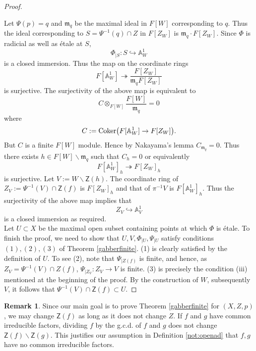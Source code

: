\documentclass[10pt]{amsart}
\theoremstyle{plain}
\theoremstyle{definition}
\newtheorem{remark}[thm]{Remark}
\newcommand{\inj}{\hookrightarrow}
\newcommand{\tensor}{\otimes}
\newcommand{\intersection}{\cap}
\newcommand{\A}{{\mathbb A}}
\let\syn\mathsf
\begin{document}
\begin{proof}
\begin{center}
\end{center}


Let $\Psi(p)=q$  and ${\mathfrak m}_q$ be the maximal ideal in $F[W]$ corresponding to $q$. Thus the ideal corresponding to $S=\Psi^{-1}(q)\intersection Z$ in $F[Z_W]$ is ${\mathfrak m}_q\cdot F[Z_W]$. Since $\Phi$ is radicial as well as \'{e}tale at $S$, $$\Phi_{|S}:S\inj \A^1_W$$ is a closed immersion. Thus the map on the coordinate rings 
$$F[\A^1_W] \twoheadrightarrow \frac{F[Z_W]}{{\mathfrak m}_q F[Z_W]}$$
is surjective. The surjectivity of the above map is equivalent to 
 $$ C\tensor_{F[W]} \frac{F[W]}{{\mathfrak m}_q}=0 $$
where $$C:={\rm Coker}\big(F[\A^1_W] \rightarrow F[Z_W]\big).$$ 
But $C$ is a finite $F[W]$ module. Hence by Nakayama's lemma $C_{{\mathfrak m}_q}=0$. Thus there exists $h \in F[W]\backslash {\mathfrak m}_q$ such that $C_h=0$ or equivalently 
$$ {F[\A^1_W]}_h \twoheadrightarrow {F[Z_W]}_h $$
is surjective.
 Let $V := W\backslash \syn{Z}(h)$. The coordinate ring of $Z_V:=\Psi^{-1}(V)\intersection \syn{Z}(f)$ is $F[Z_W]_h$ and that of $\pi^{-1}V$ is $F[\A^1_W]_h$. Thus the surjectivity of the above map implies that 
 $$ Z_V \inj \A^1_V$$ is a closed immersion as required. \\
 
Let $U\subset X$ be the maximal open subset containing points at which $\Phi$ is \'{e}tale.  To finish the proof, we need to show that $U,V, \Phi_{|U}, \Psi_{|U}$ satisfy conditions $(1),(2),(3)$ of Theorem \ref{gabberfinite}. (1) is clearly satisfied by the definition of $U$. To see (2), note that $\Psi_{|Z(f)}$ is finite, and hence, as $Z_V= \Psi^{-1}(V) \intersection Z(f)$,  $\Psi_{|Z_V}:Z_V  \to V$ is finite. (3) is precisely the condition (iii) mentioned at the beginning of the proof. By the construction of $W$, subsequently $V$, it follows that $\Psi^{-1}(V) \cap \syn{Z}(f) \subset U$.
\end{proof}

\begin{remark}\label{fgfactors} Since our main goal is to prove Theorem \ref{gabberfinite} for $(X,Z,p)$, we may change $\syn{Z}(f)$ as long as it does not change $Z$.  If $f$ and $g$ have common irreducible factors, dividing $f$ by the g.c.d. of $f$ and $g$ does not change $\syn{Z}(f) \backslash \syn{Z}(g)$. This justifies our assumption in Definition \ref{not:openad} that $f,g$ have no common irreducible factors. 
\end{remark}
\end{document}

